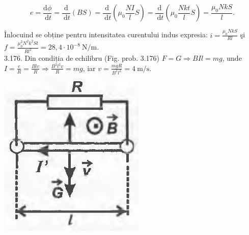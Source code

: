 \documentclass[10pt]{article}
\begin{document}
$$
e=\frac{\mathrm{d} \phi}{\mathrm{~d} t}=\frac{\mathrm{d}}{\mathrm{~d} t}(B S)=\frac{\mathrm{d}}{\mathrm{~d} t}\left(\mu_{0} \frac{N I}{l} S\right)=\frac{\mathrm{d}}{\mathrm{~d} t}\left(\mu_{0} \frac{N k t}{l} S\right)=\frac{\mu_{0} N k S}{l} .
$$

Înlocuind se obține pentru intensitatea curentului indus expresia: $i=\frac{\mu_{0} N k S}{R l}$ şi $f=\frac{\mu_{0}^{2} N^{2} k^{2} S t}{R l^{2}}=28,4 \cdot 10^{-8} \mathrm{~N} / \mathrm{m}$.\\
3.176. Din condiția de echilibru (Fig. prob. 3.176) $F=G \Rightarrow B I l=m g$, unde $I=\frac{e}{R}=\frac{B l v}{R} \Rightarrow \frac{B^{2} l^{2} v}{R}=m g$, iar $v=\frac{m g R}{B^{2} l^{2}}=4 \mathrm{~m} / \mathrm{s}$.\\
\includegraphics[max width=\textwidth, center]{2025_07_01_5b3ff9fa0d508c8e9f17g-375}
\end{document}
